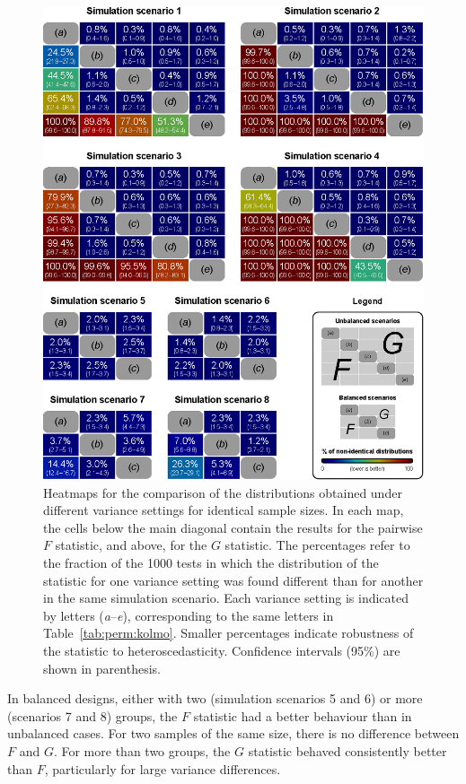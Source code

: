\begin{figure}[!p]
\centering
\includegraphics[width=12.6cm]{images/kolmo.eps}
\caption[Heatmaps for evaluation of pivotality for $F$ and $G$ statistics.]{Heatmaps for the comparison of the distributions obtained under different variance settings for identical sample sizes. In each map, the cells below the main diagonal contain the results for the pairwise $F$ statistic, and above, for the $G$ statistic. The percentages refer to the fraction of the 1000 tests in which the distribution of the statistic for one variance setting was found different than for another in the same simulation scenario. Each variance setting is indicated by letters (\emph{a}--\emph{e}), corresponding to the same letters in Table~\ref{tab:perm:kolmo}. Smaller percentages indicate robustness of the statistic to heteroscedasticity. Confidence intervals (95\%) are shown in parenthesis.}
\label{fig:perm:kolmo}
\end{figure}

In balanced designs, either with two (simulation scenarios 5 and 6) or more (scenarios 7 and 8) groups, the $F$ statistic had a better behaviour than in unbalanced cases. For two samples of the same size, there is no difference between $F$ and $G$. For more than two groups, the $G$ statistic behaved consistently better than $F$, particularly for large variance differences.


